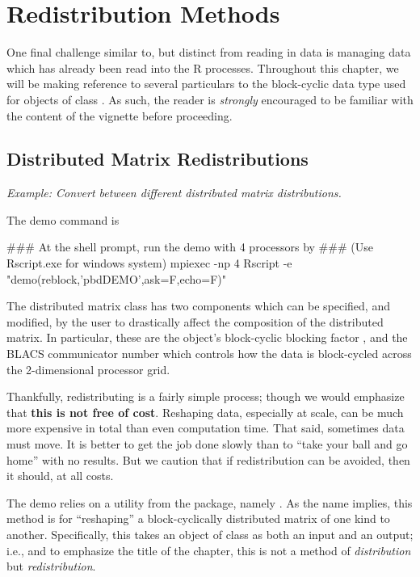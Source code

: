 \chapter{Redistribution Methods}
\label{sec:redist}

One final challenge similar to, but distinct from reading in data is managing data which has already been read into the R processes.  Throughout this chapter, we will be making reference to several particulars to the block-cyclic data type used for objects of class .  As such, the reader is \emph{strongly} encouraged to be familiar with the content of the  vignette before proceeding.

\section{Distributed Matrix Redistributions}

\emph{Example:  Convert between different distributed matrix distributions.}

The demo command is
\begin{Command}
### At the shell prompt, run the demo with 4 processors by
### (Use Rscript.exe for windows system)
mpiexec -np 4 Rscript -e "demo(reblock,'pbdDEMO',ask=F,echo=F)"
\end{Command}

The distributed matrix class  has two components which can be specified, and modified, by the user to drastically affect the composition of the distributed matrix.  In particular, these are the object's block-cyclic blocking factor , and the BLACS communicator number  which controls how the data is block-cycled across the 2-dimensional processor grid.  

Thankfully, redistributing is a fairly simple process; though we would emphasize that \textbf{this is not free of cost}.  Reshaping data, especially at scale, can be much more expensive in total than even computation time.  That said, sometimes data must move.  It is better to get the job done slowly than to ``take your ball and go home'' with no results.  But we caution that if redistribution can be avoided, then it should, at all costs.

The demo relies on a utility from the  package, namely .  As the name implies, this method is for ``reshaping'' a block-cyclically distributed matrix of one kind to another.  Specifically, this takes an object of class  as both an input and an output; i.e., and to emphasize the title of the chapter, this is not a method of \emph{distribution} but \emph{redistribution}.

